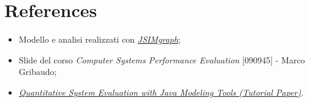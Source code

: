 \documentclass[../main.tex]{subfiles}
\begin{document}
    \chapter{References}\label{ch:references}
    \begin{itemize}
        \item Modello e analisi realizzati con \textit{\href{http://jmt.sourceforge.net/JSIMg.html}{JSIMgraph}};
        \item Slide del corso \textit{Computer Systems Performance Evaluation} [090945] - Marco Gribaudo;
        \item \href{http://citeseerx.ist.psu.edu/viewdoc/download?doi=10.1.1.302.2966&rep=rep1&type=pdf}{\textit{Quantitative System Evaluation with Java Modeling Tools (Tutorial Paper)}}.
    \end{itemize}
\end{document}
